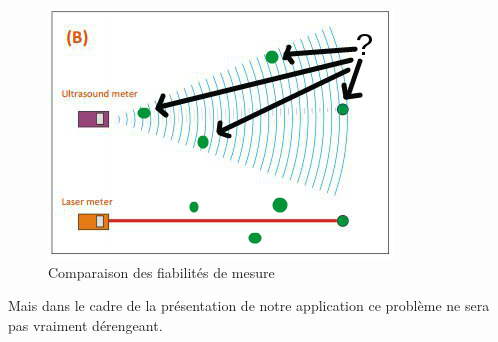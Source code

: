\documentclass[a4paper,10pt]{report}
\begin{document}
	\begin{figure}[htbp]%
	  \centering
	  \includegraphics[scale = 0.5]{img/sonarwave.png}
	  \caption{Comparaison des fiabilités de mesure}
	  \label{sonarwave}
	\end{figure}
	
	Mais dans le cadre de la présentation de notre application ce problème 
ne sera pas vraiment dérengeant.
	
\end{document}
